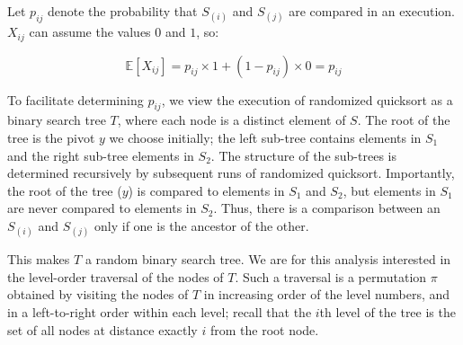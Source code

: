 Let $p_{ij}$ denote the probability that $S_{(i)}$ and $S_{(j)}$ are compared in an execution. $X_{ij}$ can
assume the values $0$ and $1$, so:

\[
	\mathbb{E}[X_{ij}] = p_{ij} \times 1 + (1 - p_{ij}) \times 0 = p_{ij}
\]

To facilitate determining $p_{ij}$, we view the execution of randomized quicksort as a binary search tree $T$, where
each node is a distinct element of $S$. The root of the tree is the pivot $y$ we choose initially; the left sub-tree
contains elements in $S_1$ and the right sub-tree elements in $S_2$. The structure of the sub-trees is determined
recursively by subsequent runs of randomized quicksort. Importantly, the root of the tree ($y$) is compared to elements
in $S_1$ and $S_2$, but elements in $S_1$ are never compared to elements in $S_2$. Thus, there is a comparison between
an $S_{(i)}$ and $S_{(j)}$ only if one is the ancestor of the other.

This makes $T$ a random binary search tree. We are for this analysis interested in the level-order traversal of the
nodes of $T$. Such a traversal is a permutation $\pi$ obtained by visiting the nodes of $T$ in increasing order of
the level numbers, and in a left-to-right order within each level; recall that the $i$th level of the tree is the set
of all nodes at distance exactly $i$ from the root node.

